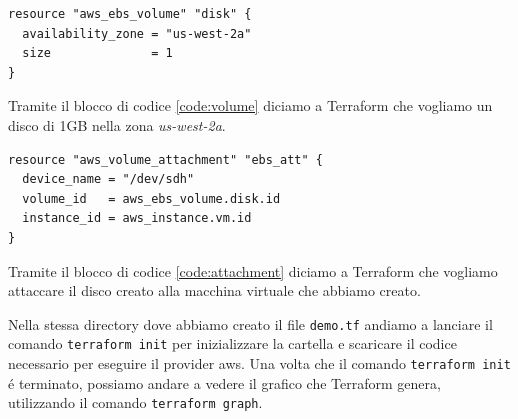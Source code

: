 \documentclass[12pt, a4paper, titlepage]{article}
\newenvironment{code}{\captionsetup{type=listing}}{}
\begin{document}
\begin{code}
	\begin{verbatim}
resource "aws_ebs_volume" "disk" {
  availability_zone = "us-west-2a"
  size              = 1
}
	\end{verbatim}
	\label{code:volume}
\end{code}
\bigskip

Tramite il blocco di codice \ref{code:volume} diciamo a Terraform che vogliamo un disco di 1GB nella zona \textit{us-west-2a}.

\begin{code}
	\begin{verbatim}
resource "aws_volume_attachment" "ebs_att" {
  device_name = "/dev/sdh"
  volume_id   = aws_ebs_volume.disk.id
  instance_id = aws_instance.vm.id
}
	\end{verbatim}
	\label{code:attachment}
\end{code}
\bigskip

Tramite il blocco di codice \ref{code:attachment} diciamo a Terraform che vogliamo attaccare il disco creato alla macchina virtuale che abbiamo creato.
\bigskip

Nella stessa directory dove abbiamo creato il file \texttt{demo.tf} andiamo a lanciare il comando \texttt{terraform init} per inizializzare la cartella e scaricare il codice necessario per eseguire il provider \gls{aws}. Una volta che il comando \texttt{terraform init} é terminato, possiamo andare a vedere il grafico che Terraform genera, utilizzando il comando \texttt{terraform graph}.
\end{document}
